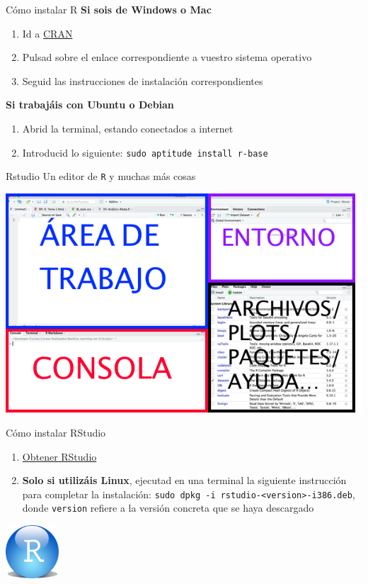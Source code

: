 \documentclass[
  ignorenonframetext,
  aspectratio=169]{beamer}
\providecommand{\tightlist}{%
  \setlength{\itemsep}{0pt}\setlength{\parskip}{0pt}}
\begin{document}
\begin{frame}[fragile]{Cómo instalar R}
\protect\hypertarget{cuxf3mo-instalar-r}{}
\textbf{Si sois de Windows o Mac}

\begin{enumerate}
\tightlist
\item
  Id a \href{http://cran.r-project.org/}{CRAN}
\item
  Pulsad sobre el enlace correspondiente a vuestro sistema operativo
\item
  Seguid las instrucciones de instalación correspondientes
\end{enumerate}

\textbf{Si trabajáis con Ubuntu o Debian}

\begin{enumerate}
\tightlist
\item
  Abrid la terminal, estando conectados a internet
\item
  Introducid lo siguiente: \texttt{sudo\ aptitude\ install\ r-base}
\end{enumerate}
\end{frame}

\begin{frame}[fragile]{Rstudio}
\protect\hypertarget{rstudio}{}
Un editor de \texttt{R} y muchas más cosas

\includegraphics[width=0.7\linewidth]{Imgs/InterfazRStudio}
\end{frame}

\begin{frame}[fragile]{Cómo instalar RStudio}
\protect\hypertarget{cuxf3mo-instalar-rstudio}{}
\begin{enumerate}
\tightlist
\item
  \href{http://www.rstudio.com/products/rstudio/download/}{Obtener
  RStudio}
\item
  \textbf{Solo si utilizáis Linux}, ejecutad en una terminal la
  siguiente instrucción para completar la instalación:
  \texttt{sudo\ dpkg\ -i\ rstudio-\textless{}version\textgreater{}-i386.deb},
  donde \texttt{version} refiere a la versión concreta que se haya
  descargado
\end{enumerate}

\begin{center}\includegraphics[width=75px]{Imgs/RSLogo} \end{center}
\end{frame}
\end{document}
